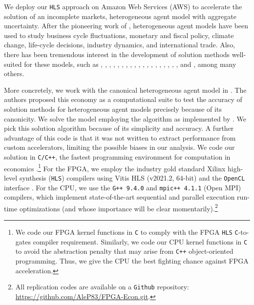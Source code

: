 \documentclass[12pt,american]{article}
\begin{document}
We deploy our \texttt{HLS} approach on Amazon Web Services (AWS) to accelerate the solution of an incomplete markets, heterogeneous agent model with aggregate uncertainty. After the pioneering work of \citet{KrusellSmith1998}, heterogeneous agent models have been used to study business cycle fluctuations, monetary and fiscal policy, climate change, life-cycle decisions, industry dynamics, and international trade. Also, there has been tremendous interest in the development of solution methods well-suited for these models, such as \citet{Algan2008}, \citet{Reiter2009}, \citet{DenHaan2010}, \citet{MaliarMaliarValli2010}, \citet{Reiter2010}, \citet{Young2010}, \citet{algan2014solving}, \citet{Prohl2015}, \citet{Achdou2017}, \citet{Bhandari2017}, \citet{Brumm2017}, \citet{Judd2017}, \citet{Bayer2018}, \citet{Childers2018}, \citet{Mertens2018}, \citet{Winberry2018}, \citet{fernandez2019financial}, \citet{Auclert2019},  \citet{Bilal2021}, and \citet{MahdiEbrahimiKahou2021}, among many others.

More concretely, we work with the canonical heterogeneous agent model in \citet{DenHaan2010_model}. The authors proposed this economy as a computational suite to test the accuracy of solution methods for heterogeneous agent models precisely because of its canonicity. We solve the model employing the \cite{KrusellSmith1998} algorithm as implemented by \cite{MaliarMaliarValli2010}. We pick this solution algorithm because of its simplicity and accuracy. A further advantage of this code is that it was not written to extract performance from custom accelerators, limiting the possible biases in our analysis. We code our solution in \texttt{C/C++}, the fastest programming environment for computation in economics \citep{Aruoba2015}.\footnote{We code our FPGA kernel functions in \texttt{C} to comply with the FPGA \texttt{HLS} \texttt{C}-to-gates compiler requirement. Similarly, we code our CPU kernel functions in \texttt{C} to avoid the abstraction penalty that may arise from \texttt{C++} object-oriented programming. Thus, we give the CPU the best fighting chance against FPGA acceleration.} For the FPGA, we employ the industry gold standard Xilinx high-level synthesis (\texttt{HLS}) compilers using Vitis HLS (v2021.2, 64-bit) and the \texttt{OpenCL} interface \citep{xilinx_ug1145}. For the CPU, we use the \texttt{G++ 9.4.0} and \texttt{mpic++ 4.1.1} (Open MPI) compilers, which implement state-of-the-art sequential and parallel execution run-time optimizations (and whose importance will be clear momentarily).\footnote{All replication codes are available on a \texttt{Github} repository: \url{https://github.com/AleP83/FPGA-Econ.git}.}
\end{document}
